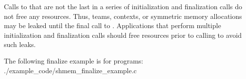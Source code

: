 \begin{apidefinition}
{    Calls to  that are not the last in a series of
    initialization and finalization calls do not free any \openshmem resources.
    Thus, teams, contexts, or symmetric memory allocations may be leaked until
    the final call to . Applications that perform
    multiple initialization and finalization calls should free resources prior
    to calling  to avoid such leaks.
}

\begin{apiexamples}

\apicexample
    {The following finalize example is for \Cstd[11] programs:}
    {./example_code/shmem_finalize_example.c}
    {}

\end{apiexamples}

\end{apidefinition}
